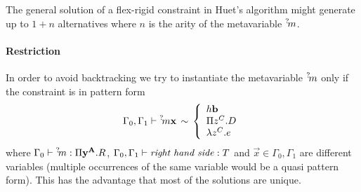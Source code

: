 The general solution of a flex-rigid constraint in Huet's algorithm might
generate up to $1 + n$ alternatives where $n$ is the arity of the metavariable
${{}^? \kern-0.2em m}$.




\paragraph{Restriction}
In order to avoid backtracking we try to instantiate the metavariable ${{}^? \kern-0.2em m}$
only if the constraint is in pattern form
$$
    \Gamma_0, \Gamma_1
    \vdash
    {{}^? \kern-0.2em m} {\mathbf x}
    \,\sim\,
    \left\{ \begin{array}{lllll} 
        h {\mathbf b}
        \\
        \Pi z^C . D
        \\
        \lambda z^C . e
     \end{array} \right.
$$
where
$\Gamma_0 \vdash {{}^? \kern-0.2em m} : \Pi {\mathbf y}^{{\mathbf A}}. R$, $\Gamma_0,
\Gamma_1 \vdash \text{\emph{right hand side}} : T$
and
$\vec x \in \Gamma_0, \Gamma_1$
are different variables (multiple occurrences of the same variable would be a
quasi pattern form). This has the advantage that most of the solutions are
unique.

